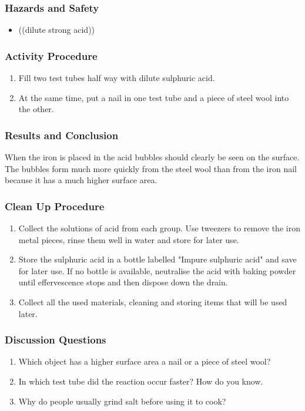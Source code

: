 \subsubsection*{Hazards and Safety}
\begin{itemize}
\item{((dilute strong acid))}
\end{itemize}

\subsubsection*{Activity Procedure}
\begin{enumerate}
\item{Fill two test tubes half way with dilute sulphuric acid.}
\item{At the same time, put a nail in one test tube and a piece of steel wool into the other.}
\end{enumerate}

\subsubsection*{Results and Conclusion}
When the iron is placed in the acid bubbles should clearly be seen on the surface. The bubbles form much more quickly from the steel wool than from the iron nail because it has a much higher surface area.

\subsubsection*{Clean Up Procedure}
\begin{enumerate}
\item{Collect the solutions of acid from each group. Use tweezers to remove the iron metal pieces, rinse them well in water and store for later use.}
\item{Store the sulphuric acid in a bottle labelled "Impure sulphuric acid" and save for later use. If no bottle is available, neutralise the acid with baking powder until effervescence stops and then dispose down the drain.}
\item{Collect all the used materials, cleaning and storing items that will be used later.}
\end{enumerate}

\subsubsection*{Discussion Questions}
\begin{enumerate}
\item{Which object has a higher surface area a nail or a piece of steel wool?}
\item{In which test tube did the reaction occur faster? How do you know.}
\item{Why do people usually grind salt before using it to cook?}
\end{enumerate}

